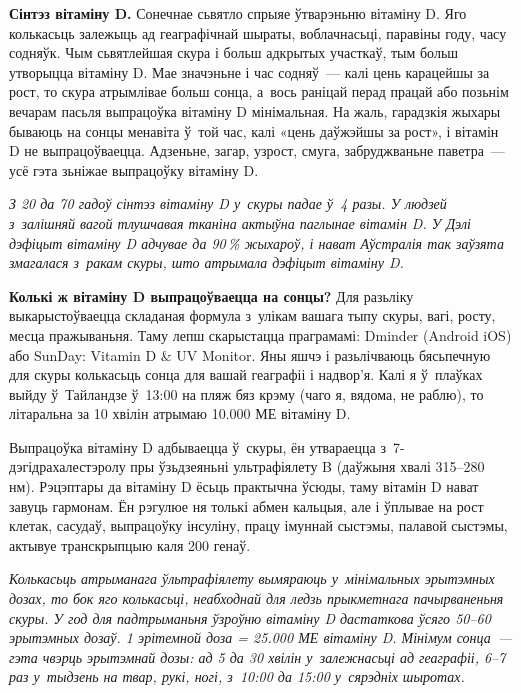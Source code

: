 \textbf{Сінтэз вітаміну D.} Сонечнае сьвятло спрыяе ўтварэньню вітаміну D. Яго колькасьць залежыць ад геаграфічнай шыраты, воблачнасьці, паравіны году, часу содняўк. Чым сьвятлейшая скура і больш адкрытых участкаў, тым больш утворыцца вітаміну D. Мае значэньне і час содняў~--- калі цень карацейшы за рост, то скура атрымлівае больш сонца, а~вось раніцай перад працай або позьнім вечарам пасьля выпрацоўка вітаміну D мінімальная. На жаль, гарадзкія жыхары бываюць на сонцы менавіта ў~той час, калі «цень даўжэйшы за рост», і вітамін D не выпрацоўваецца. Адзеньне, загар, узрост, смуга, забруджваньне паветра~--- усё гэта зьніжае выпрацоўку вітаміну D.

\emph{З 20 да 70 гадоў сінтэз вітаміну D у~скуры падае ў~4 разы. У людзей з~залішняй вагой тлушчавая тканіна актыўна паглынае вітамін D. У Дэлі дэфіцыт вітаміну D адчувае да 90\,\% жыхароў, і нават Аўстралія так заўзята змагалася з~ракам скуры, што атрымала дэфіцыт вітаміну D.} 

\textbf{Колькі ж вітаміну D выпрацоўваецца на сонцы?} Для разьліку выкарыстоўваецца складаная формула з~улікам вашага тыпу скуры, вагі, росту, месца пражываньня. Таму лепш скарыстацца праграмамі: Dminder (Android iOS) або SunDay: Vitamin D \& UV Monitor. Яны яшчэ і разьлічваюць бясьпечную для скуры колькасьць сонца для вашай геаграфіі і надвор'я. Калі я ў~плаўках выйду ў~Тайландзе ў~13:00 на пляж бяз крэму (чаго я, вядома, не раблю), то літаральна за 10 хвілін атрымаю 10.000 МЕ вітаміну D. 


Выпрацоўка вітаміну D адбываецца ў~скуры, ён утвараецца з~7-дэгідрахалестэролу пры ўзьдзеяньні ультрафіялету B (даўжыня хвалі 315--280 нм). Рэцэптары да вітаміну D ёсьць практычна ўсюды, таму вітамін D нават завуць гармонам. Ён рэгулюе ня толькі абмен кальцыя, але і ўплывае на рост клетак, сасудаў, выпрацоўку інсуліну, працу імуннай сыстэмы, палавой сыстэмы, актывуе транскрыпцыю каля 200 генаў.

\emph{Колькасьць атрыманага ўльтрафіялету вымяраюць у~мінімальных эрытэмных дозах, то бок яго колькасьці, неабходнай для ледзь прыкметнага пачырваненьня скуры. У год для падтрыманьня ўзроўню вітаміну D дастаткова ўсяго 50--60 эрытэмных дозаў. 1 эрітемной доза = 25.000 МЕ вітаміну D. Мінімум сонца~--- гэта чвэрць эрытэмнай дозы: ад 5 да 30 хвілін у~залежнасьці ад геаграфіі, 6--7 раз у~тыдзень на твар, рукі, ногі, з~10:00 да 15:00 у~сярэдніх шыротах.}

